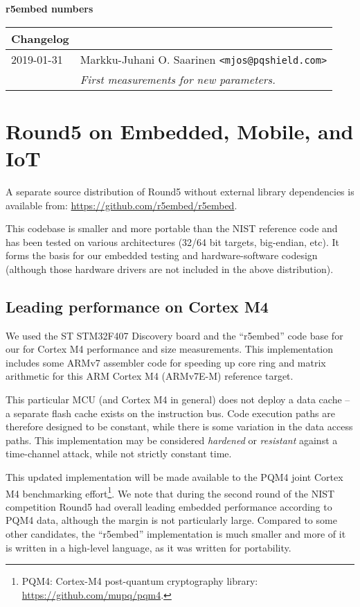\documentclass[a4paper]{article}
\begin{document}
\begin{center}
    {\large {\bf r5embed numbers \pdfdate}}

\vspace{3ex}
\begin{tabular}{l p{90mm}}
{\bf Changelog} \\
\hline
2019-01-31  & Markku-Juhani O. Saarinen \verb|<mjos@pqshield.com>| \\
            & {\it First measurements for new parameters.}  \\
\hline
\end{tabular}
\end{center}


\section{Round5 on Embedded, Mobile, and IoT}

A separate source distribution of Round5 without external library
dependencies is available from: \url{https://github.com/r5embed/r5embed}.

This codebase is smaller and more portable than the NIST reference code and 
has been tested on various architectures (32/64 bit targets, big-endian, etc). 
It forms the basis for our embedded testing and hardware-software codesign 
(although those hardware drivers are not included in the above distribution).

\subsection{Leading performance on Cortex M4}

We used the ST STM32F407 Discovery board and the ``r5embed'' code base for our
for Cortex M4 performance and size measurements. This implementation
includes some ARMv7 assembler code for speeding up core ring and matrix
arithmetic for this ARM Cortex M4 (ARMv7E-M) reference target.

This particular MCU (and Cortex M4 in general) does not deploy a data cache --
a separate flash cache exists on the instruction bus. Code execution paths are
therefore designed to be constant, while there is some variation in the data
access paths. This implementation may be considered \emph{hardened} or
\emph{resistant} against a time-channel attack, while not strictly constant 
time.

This updated implementation will be made available to the PQM4 joint Cortex M4
benchmarking effort\footnote{PQM4: Cortex-M4 post-quantum cryptography library:
\url{https://github.com/mupq/pqm4}.}. We note that during the second round of 
the NIST competition Round5 had overall leading embedded performance according 
to PQM4 data, although the margin is not particularly large. Compared to
some other candidates, the ``r5embed'' implementation is much smaller and more 
of it is written in a high-level language, as it was written for portability.
\end{document}
